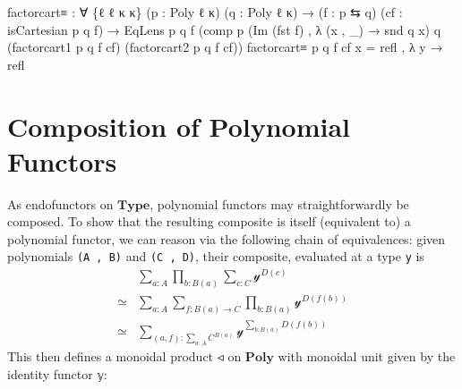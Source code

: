 \documentclass[
  11pt,
  oneside,
  article]{memoir}
\newenvironment{Shaded}{}{}
\newcommand{\NormalTok}[1]{#1}
\newcommand{\OtherTok}[1]{\textcolor[rgb]{0.00,0.44,0.13}{#1}}
\theoremstyle{definition}
\theoremstyle{plain}
\newcommand{\yon}{\mathcal{y}}
\newcommand{\0}{\textsf{0}}
\newcommand{\1}{\tn{\textsf{1}}}
\begin{document}
\begin{Shaded}
\begin{Highlighting}[]
\NormalTok{factorcart≡ }\OtherTok{:} \OtherTok{∀} \OtherTok{\{}\NormalTok{ℓ ℓ\textquotesingle{} κ κ\textquotesingle{}}\OtherTok{\}} \OtherTok{(}\NormalTok{p }\OtherTok{:}\NormalTok{ Poly ℓ κ}\OtherTok{)} \OtherTok{(}\NormalTok{q }\OtherTok{:}\NormalTok{ Poly ℓ\textquotesingle{} κ\textquotesingle{}}\OtherTok{)}
              \OtherTok{→} \OtherTok{(}\NormalTok{f }\OtherTok{:}\NormalTok{ p ⇆ q}\OtherTok{)} \OtherTok{(}\NormalTok{cf }\OtherTok{:}\NormalTok{ isCartesian p q f}\OtherTok{)}
              \OtherTok{→}\NormalTok{ EqLens p q f}
                       \OtherTok{(}\NormalTok{comp p }\OtherTok{(}\NormalTok{Im }\OtherTok{(}\NormalTok{fst f}\OtherTok{)}\NormalTok{ , }\OtherTok{λ} \OtherTok{(}\NormalTok{x , }\OtherTok{\_)} \OtherTok{→}\NormalTok{ snd q x}\OtherTok{)}\NormalTok{ q}
                             \OtherTok{(}\NormalTok{factorcart1 p q f cf}\OtherTok{)}
                             \OtherTok{(}\NormalTok{factorcart2 p q f cf}\OtherTok{))}
\NormalTok{factorcart≡ p q f cf x }\OtherTok{=}\NormalTok{ refl , }\OtherTok{λ}\NormalTok{ y }\OtherTok{→}\NormalTok{ refl}
\end{Highlighting}
\end{Shaded}

\section{Composition of Polynomial
Functors}\label{composition-of-polynomial-functors}

As endofunctors on \(\mathbf{Type}\), polynomial functors may
straightforwardly be composed. To show that the resulting composite is
itself (equivalent to) a polynomial functor, we can reason via the
following chain of equivalences: given polynomials \texttt{(A\ ,\ B)}
and \texttt{(C\ ,\ D)}, their composite, evaluated at a type \texttt{y}
is \[
\begin{array}{rl}
& \sum_{a : A} \prod_{b : B(a)} \sum_{c : C} \yon^{D(c)}\\
\simeq & \sum_{a : A} \sum_{f : B(a) \to C} \prod_{b : B(a)} \yon^{D(f(b))}\\
\simeq & \sum_{(a , f) : \sum_{a : A} C^{B(a)}} \yon^{\sum_{b : B(a)} D(f(b))}
\end{array}
\] This then defines a monoidal product \(◃\) on \(\mathbf{Poly}\) with
monoidal unit given by the identity functor \texttt{𝕪}:
\end{document}
